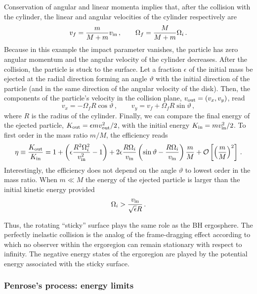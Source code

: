 \documentclass[11pt]{article}
\numberwithin{equation}{section} %
\begin{document}
Conservation of angular and linear momenta implies that, after the collision with the cylinder, the linear and angular velocities of the cylinder respectively are
\begin{equation}
 v_f=\frac{m}{M+m}v_{\rm in}\,,\qquad \Omega_f=\frac{M}{M+m}\Omega_i\,.
\end{equation}
Because in this example the impact parameter vanishes, the particle has zero angular momentum and the angular velocity of the cylinder decreases. After the collision, the particle is stuck to the surface. Let a fraction $\epsilon$ of the initial mass be ejected at the radial direction forming an angle $\vartheta$ with the initial direction of the particle (and in the same direction of the angular velocity of the disk). Then, the components of the particle's velocity in the collision plane, $v_{\rm out}=(v_x,v_y)$, read
\begin{equation}
 v_x=-\Omega_f R \cos\vartheta\,,\qquad v_y=v_f+\Omega_f R\sin\vartheta\,,
\end{equation}
where $R$ is the radius of the cylinder. Finally, we can compare the final energy of the ejected particle, $K_{\rm out}=\epsilon m v_{\rm out}^2/2$, with the initial energy $K_{\rm in}=m v_{\rm in}^2/2$. To first order in the mass ratio $m/M$, the efficiency reads
\begin{equation}
 \eta\equiv\frac{K_{\rm out}}{K_{\rm in}}=1+\left(\epsilon\frac{R^2\Omega_i^2}{v_{\rm in}^2}-1\right)+2\epsilon \frac{ R \Omega_i}{v_{\rm in}}\left(\sin\vartheta-\frac{R\Omega_i}{v_{\rm in}}\right)\frac{m}{M}+{\cal O}\left[\left(\frac{m}{M}\right)^2\right]\,.
\end{equation}
Interestingly, the efficiency does not depend on the angle $\vartheta$ to lowest order in the mass ratio. When $m\ll M$ the energy of the ejected particle is larger than the initial kinetic energy provided
%
\begin{equation}
 \Omega_i>\frac{v_{\rm in}}{\sqrt{\epsilon} R}\,.
\end{equation}
%

Thus, the rotating ``sticky'' surface plays the same role as the BH ergosphere. The perfectly inelastic collision is the analog of the frame-dragging effect according to which no observer within the ergoregion can remain stationary with respect to infinity. The negative energy states of the ergoregion are played by the potential energy associated with the sticky surface.

\subsubsection{Penrose's process: energy limits}
\end{document}

